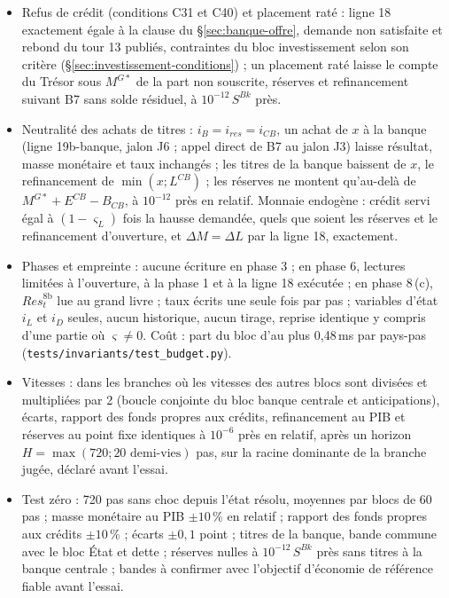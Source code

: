 \documentclass[11pt,a4paper]{article}
\begin{document}
\begin{proposee}
\begin{itemize}
\item Refus de crédit (conditions C31 et C40) et placement raté : ligne 18 exactement égale à la clause du \S\ref{sec:banque-offre}, demande non satisfaite et rebond du tour 13 publiés, contraintes du bloc investissement selon son critère (\S\ref{sec:investissement-conditions}) ; un placement raté laisse le compte du Trésor sous $M^{G*}$ de la part non souscrite, réserves et refinancement suivant B7 sans solde résiduel, à $10^{-12}\,S^{\mathit{Bk}}$ près.
\item Neutralité des achats de titres : $i_B = i_{\mathit{res}} = i_{\mathit{CB}}$, un achat de $x$ à la banque (ligne 19b-banque, jalon J6 ; appel direct de B7 au jalon J3) laisse résultat, masse monétaire et taux inchangés ; les titres de la banque baissent de $x$, le refinancement de $\min(x ; L^{\mathit{CB}})$ ; les réserves ne montent qu'au-delà de $M^{G*} + E^{\mathit{CB}} - B_{\mathit{CB}}$, à $10^{-12}$ près en relatif. Monnaie endogène : crédit servi égal à $(1 - \varsigma_L)$ fois la hausse demandée, quels que soient les réserves et le refinancement d'ouverture, et $\Delta M = \Delta L$ par la ligne 18, exactement.
\item Phases et empreinte : aucune écriture en phase 3 ; en phase 6, lectures limitées à l'ouverture, à la phase 1 et à la ligne 18 exécutée ; en phase 8\,(c), $\mathit{Res}^{8\mathrm{b}}_t$ lue au grand livre ; taux écrits une seule fois par pas ; variables d'état $i_L$ et $i_D$ seules, aucun historique, aucun tirage, reprise identique y compris d'une partie où $\varsigma \neq 0$. Coût : part du bloc d'au plus 0,48\,ms par pays-pas (\nolinkurl{tests/invariants/test_budget.py}).
\item Vitesses : dans les branches où les vitesses des autres blocs sont divisées et multipliées par 2 (boucle conjointe du bloc banque centrale et anticipations), écarts, rapport des fonds propres aux crédits, refinancement au PIB et réserves au point fixe identiques à $10^{-6}$ près en relatif, après un horizon $H = \max(720 ; \text{20 demi-vies})$ pas, sur la racine dominante de la branche jugée, déclaré avant l'essai.
\item Test zéro : 720 pas sans choc depuis l'état résolu, moyennes par blocs de 60 pas ; masse monétaire au PIB $\pm 10\,\%$ en relatif ; rapport des fonds propres aux crédits $\pm 10\,\%$ ; écarts $\pm 0{,}1$ point ; titres de la banque, bande commune avec le bloc État et dette ; réserves nulles à $10^{-12}\,S^{\mathit{Bk}}$ près sans titres à la banque centrale ; bandes à confirmer avec l'objectif d'économie de référence fiable avant l'essai.

\end{itemize}
\end{proposee}
\end{document}
